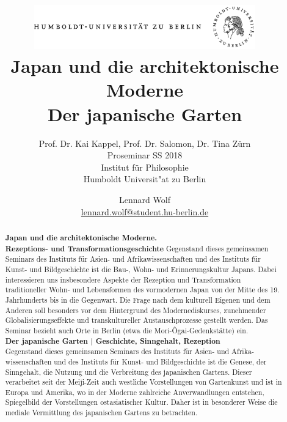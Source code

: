 \documentclass[emulatestandardclasses]{scrartcl}
\date{\vspace{-3ex}}
\begin{document}
\title{
	\includegraphics*[bb=0 0 720 200, width=0.72\textwidth]{ErstesSem/images/hu_logo.png}\\
	\vspace{25pt}
	Japan und die architektonische Moderne
	\\
	Der japanische Garten}
\subtitle{\vspace{10pt}
			Prof. Dr. Kai Kappel, Prof. Dr. Salomon, Dr. Tina Zürn\\
			Proseminar SS 2018\\
          Institut für Philosophie\\ 
          Humboldt Universit"at zu Berlin}
\author{Lennard Wolf\\
        \small{\href{mailto:lennard.wolf@student.hu-berlin.de}{lennard.wolf@student.hu-berlin.de}}}
\maketitle
\begin{abstract}

\noindent \textbf{Japan und die architektonische Moderne.\\ Rezeptions- und Transformationsgeschichte}\newline
\indent Gegenstand dieses gemeinsamen Seminars des Instituts für Asien- und Afrikawissenschaften und des Instituts für Kunst- und Bildgeschichte ist die Bau-, Wohn- und Erinnerungskultur Japans. Dabei interessieren uns insbesondere Aspekte der Rezeption und Transformation traditioneller Wohn- und Lebensformen des vormodernen Japan von der Mitte des 19. Jahrhunderts bis in die Gegenwart. Die Frage nach dem kulturell Eigenen und dem Anderen soll besonders vor dem Hintergrund des Modernediskurses, zunehmender Globalisierungseffekte und transkultureller Austauschprozesse gestellt werden. Das Seminar bezieht auch Orte in Berlin (etwa die Mori-Ôgai-Gedenkstätte) ein.\\
\textbf{Der japanische Garten | Geschichte, Sinngehalt, Rezeption}\\
\indent Gegenstand dieses gemeinsamen Seminars des Instituts für Asien- und Afrika­wissenschaften und des Instituts für Kunst- und Bildgeschichte ist die Genese, der Sinngehalt, die Nutzung und die Verbreitung des japanischen Gartens. Dieser verarbeitet seit der Meiji-Zeit auch westliche Vorstellungen von Gartenkunst und ist in Europa und Amerika, wo in der Moderne zahlreiche Anverwandlungen entstehen, Spiegelbild der Vorstellungen ostasiatischer Kultur. Daher ist in besonderer Weise die mediale Vermittlung des japanischen Gartens zu betrachten.

\end{abstract}
\newpage
\end{document}
